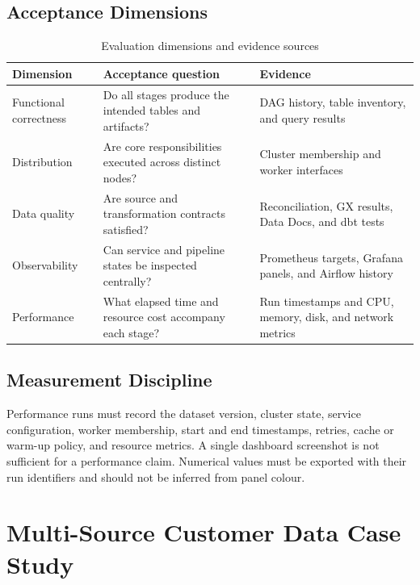 \subsection{Acceptance Dimensions}
\begin{table}[htbp]
    \centering
    \small
    \begin{tabularx}{\textwidth}{|>{\RaggedRight\arraybackslash}p{}|>{\RaggedRight\arraybackslash}X|>{\RaggedRight\arraybackslash}X|}
        \hline
        \rowcolor{ModernTableHeader}
        \color{white}\textbf{Dimension} & \color{white}\textbf{Acceptance question} & \color{white}\textbf{Evidence} \\
        \hline
        Functional correctness & Do all stages produce the intended tables and artifacts? & DAG history, table inventory, and query results \\
        \hline
        Distribution & Are core responsibilities executed across distinct nodes? & Cluster membership and worker interfaces \\
        \hline
        Data quality & Are source and transformation contracts satisfied? & Reconciliation, GX results, Data Docs, and dbt tests \\
        \hline
        Observability & Can service and pipeline states be inspected centrally? & Prometheus targets, Grafana panels, and Airflow history \\
        \hline
        Performance & What elapsed time and resource cost accompany each stage? & Run timestamps and CPU, memory, disk, and network metrics \\
        \hline
    \end{tabularx}
    \caption{Evaluation dimensions and evidence sources}
    \label{tab:evaluation-dimensions}
\end{table}

\subsection{Measurement Discipline}
Performance runs must record the dataset version, cluster state, service configuration, worker membership, start and end timestamps, retries, cache or warm-up policy, and resource metrics. A single dashboard screenshot is not sufficient for a performance claim. Numerical values must be exported with their run identifiers and should not be inferred from panel colour.

\section{Multi-Source Customer Data Case Study}

